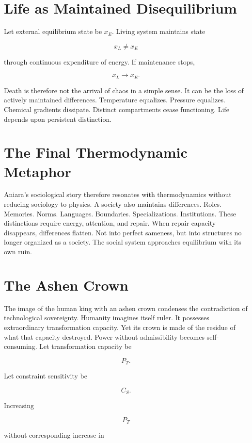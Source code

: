 \documentclass[11pt,oneside]{book}
\theoremstyle{definition}
\theoremstyle{remark}
\begin{document}
\section{Life as Maintained Disequilibrium}

Let external equilibrium state be \(x_E\). Living system maintains state

\[
x_L\neq x_E
\]

through continuous expenditure of energy. If maintenance stops,

\[
x_L\rightarrow x_E.
\]

Death is therefore not the arrival of chaos in a simple sense. It can be the loss of actively
maintained differences. Temperature equalizes. Pressure equalizes. Chemical gradients dissipate.
Distinct compartments cease functioning. Life depends upon persistent distinction.

\section{The Final Thermodynamic Metaphor}

Aniara's sociological story therefore resonates with thermodynamics without reducing sociology to
physics. A society also maintains differences. Roles. Memories. Norms. Languages. Boundaries.
Specializations. Institutions. These distinctions require energy, attention, and repair. When repair
capacity disappears, differences flatten. Not into perfect sameness, but into structures no longer
organized as a society. The social system approaches equilibrium with its own ruin.

\section{The Ashen Crown}

The image of the human king with an ashen crown condenses the contradiction of technological
sovereignty. Humanity imagines itself ruler. It possesses extraordinary transformation capacity. Yet
its crown is made of the residue of what that capacity destroyed. Power without admissibility
becomes self-consuming. Let transformation capacity be

\[
P_T.
\]

Let constraint sensitivity be

\[
C_S.
\]

Increasing

\[
P_T
\]

without corresponding increase in
\end{document}
